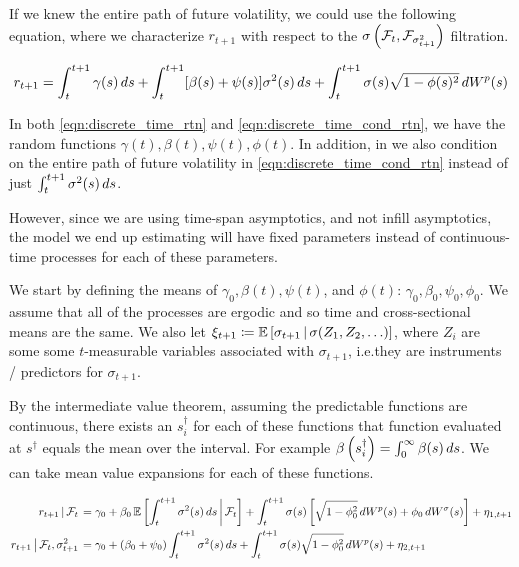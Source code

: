 \documentclass[11pt, letterpaper, twoside, final]{article}
\begin{document}
If we knew the entire path of future volatility, we could use the following equation, where we characterize
$r_{t+1}$ with respect to the $\sigma\left(\mathcal{F}_{t}, \mathcal{F}_{\sigma^2_{t+1}}\right)$ filtration.

\begin{equation}
    \label{eqn:discrete_time_cond_rtn}
    r_{t+1} = \int_t^{t+1} \gamma(s) \mathop{}\!d s + \int_{t}^{t+1} [\beta(s) + \psi(s)] \sigma^2(s) \mathop{}\!d s +
    \int_t^{t+1} \sigma(s) \sqrt{1-\phi(s)^2} \mathop{}\!d W^{p}(s)
\end{equation}

In both \cref{eqn:discrete_time_rtn} and \cref{eqn:discrete_time_cond_rtn}, we have the random functions
$\gamma(t), \beta(t), \psi(t), \phi(t)$.
In addition, in we also condition on the entire path of future volatility in \cref{eqn:discrete_time_cond_rtn}
instead of just $\int_t^{t+1} \sigma^2(s) \mathop{}\!d s$.

However, since we are using time-span  asymptotics, and not infill asymptotics, the model we end up estimating
will have fixed parameters instead of continuous-time processes for each of these parameters.

We start by defining the means of $\gamma_0, \beta(t), \psi(t)$, and $\phi(t)$: $\gamma_0, \beta_0, \psi_0, \phi_0$.
We assume that all of the processes are ergodic and so time and cross-sectional means are the same.
We also let $\xi_{t+1} \coloneqq \operatorname{\mathbb{E}}\left[\sigma_{t+1} \,\middle\vert\, \sigma(Z_1,Z_2, \ldots) \right]$, where $Z_i$ are
some some $t$-measurable variables associated with $\sigma_{t+1}$, i.e.\@ they are instruments / predictors for
$\sigma_{t+1}$.


By the intermediate value theorem, assuming the predictable functions are continuous, there exists an
$s_i^{\dagger}$ for each of these functions that function evaluated at $s^{\dagger}$ equals the mean over the
interval.
For example $\beta\left(s_i^{\dagger}\right) = \int_0^{\infty} \beta(s) \mathop{}\!d s$.  
We can take mean value expansions for each of these functions.

\begin{alignat}{1}
    \label{eqn:price_decomp}
    \left. r_{t+1} \,\middle\vert\, \mathcal{F}_t \right. 
    &= \gamma_0 + \beta_0 \operatorname{\mathbb{E}}\left[\int_t^{t+1} \sigma^2(s) \mathop{}\!d s \,\middle\vert\, \mathcal{F}_t\right] + \int_t^{t+1} \sigma(s)
       \left[\sqrt{1 - \phi_0^2} \mathop{}\!d W^{p}(s) + \phi_0 \mathop{}\!d W^{\sigma}(s)\right] + \eta_{1,t+1} \\
    \left. r_{t+1} \,\middle\vert\, \mathcal{F}_t, \sigma^2_{t+1} \right. 
    &= \gamma_0 + (\beta_0 + \psi_0) \int_t^{t+1} \sigma^2(s) \mathop{}\!d s + \int_t^{t+1} \sigma(s) \sqrt{1-\phi_0^2}
       \mathop{}\!d W^{p}(s) + \eta_{2, t+1} 
\end{alignat}
\end{document}
